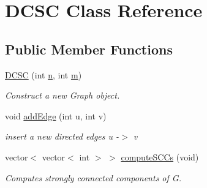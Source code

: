 \hypertarget{classDCSC}{}\section{D\+C\+SC Class Reference}
\label{classDCSC}
\subsection*{Public Member Functions}
\begin{DoxyCompactItemize}
\item 
\mbox{\hyperlink{classDCSC_a9d23a63eca7b3007daa3e1c6f6a61f2c}{D\+C\+SC}} (int \mbox{\hyperlink{classDCSC_a8fb298259f65294a77e45bb5b4895171}{n}}, int \mbox{\hyperlink{classDCSC_a847c678bc6a65c21fc2ade8fc78b2859}{m}})
\begin{DoxyCompactList}\small\item\em Construct a new Graph object. \end{DoxyCompactList}\item 
void \mbox{\hyperlink{classDCSC_ac971c9c7f4b35eebaab12f9dc399e260}{add\+Edge}} (int u, int v)
\begin{DoxyCompactList}\small\item\em insert a new directed edges u -\/$>$ v \end{DoxyCompactList}\item 
vector$<$ vector$<$ int $>$ $>$ \mbox{\hyperlink{classDCSC_a287ebcdb5c7588d274e0b9574af0451e}{compute\+S\+C\+Cs}} (void)
\begin{DoxyCompactList}\small\item\em Computes strongly connected components of G. \end{DoxyCompactList}\end{DoxyCompactItemize}
